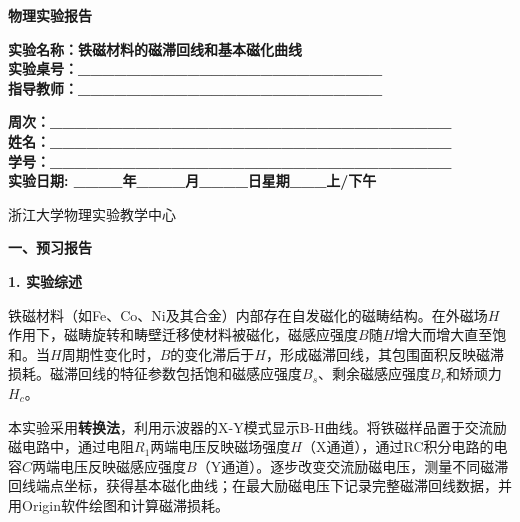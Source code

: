 \documentclass[a4paper,12pt]{article}
\begin{document}
\begin{center}
    \vspace*{2cm}
    {\fontsize{36pt}{43pt}\selectfont \textbf{物理实验报告}}
    \vspace{3cm}
\end{center}

\begin{center}
    \fontsize{16pt}{24pt}\selectfont
    \textbf{实验名称：铁磁材料的磁滞回线和基本磁化曲线\quad} \\[0.5em]
    \textbf{实验桌号：\_\_\_\_\_\_\_\_\_\_\_\_\_\_\_\_\_\_\_\_\_\_\_\_\_} \\[0.5em]
    \textbf{指导教师：\_\_\_\_\_\_\_\_\_\_\_\_\_\_\_\_\_\_\_\_\_\_\_\_\_}
\end{center}

\vspace{2cm}

\begin{center}
    \fontsize{14pt}{28pt}\selectfont
    \textbf{周次：\_\_\_\_\_\_\_\_\_\_\_\_\_\_\_\_\_\_\_\_\_\_\_\_\_\_\_\_\_\_\_\_\_} \\
    \textbf{姓名：\_\_\_\_\_\_\_\_\_\_\_\_\_\_\_\_\_\_\_\_\_\_\_\_\_\_\_\_\_\_\_\_\_} \\
    \textbf{学号：\_\_\_\_\_\_\_\_\_\_\_\_\_\_\_\_\_\_\_\_\_\_\_\_\_\_\_\_\_\_\_\_\_} \\[0.5em]
    \textbf{实验日期: \_\_\_\_年\_\_\_\_月\_\_\_\_日\quad 星期\_\_\_上/下午}
\end{center}

\vspace{1.5cm}

\begin{center}
    \fontsize{14pt}{20pt}\selectfont
    浙江大学物理实验教学中心
\end{center}

\newpage

{\fontsize{16pt}{24pt}\selectfont \textbf{一、预习报告}}

\vspace{0.5cm}
{\fontsize{14pt}{20pt}\selectfont \textbf{1. 实验综述}}

\vspace{0.3cm}

{\fontsize{12pt}{18pt}\selectfont

铁磁材料（如Fe、Co、Ni及其合金）内部存在自发磁化的磁畴结构。在外磁场$H$作用下，磁畴旋转和畴壁迁移使材料被磁化，磁感应强度$B$随$H$增大而增大直至饱和。当$H$周期性变化时，$B$的变化滞后于$H$，形成磁滞回线，其包围面积反映磁滞损耗。磁滞回线的特征参数包括饱和磁感应强度$B_s$、剩余磁感应强度$B_r$和矫顽力$H_c$。

本实验采用\textbf{转换法}，利用示波器的X-Y模式显示B-H曲线。将铁磁样品置于交流励磁电路中，通过电阻$R_1$两端电压反映磁场强度$H$（X通道），通过RC积分电路的电容$C$两端电压反映磁感应强度$B$（Y通道）。逐步改变交流励磁电压，测量不同磁滞回线端点坐标，获得基本磁化曲线；在最大励磁电压下记录完整磁滞回线数据，并用Origin软件绘图和计算磁滞损耗。

}
\end{document}
